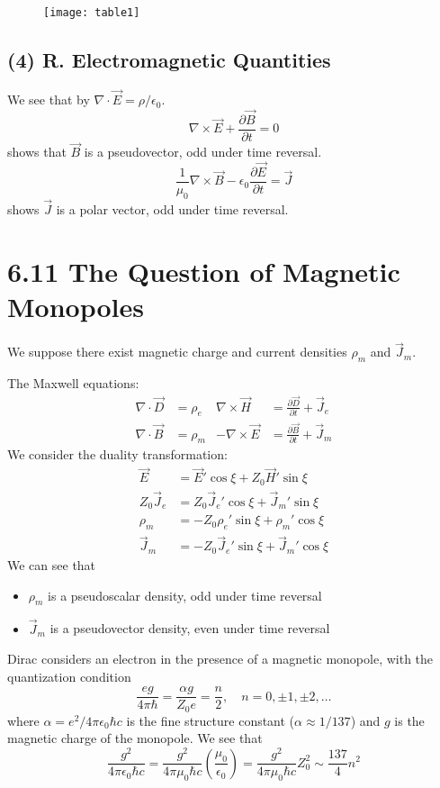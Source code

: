 \documentclass{article}
\begin{document}
	\begin{figure}[h]
		\centering
		\texttt{[image: table1]}
		\caption{}
		\label{table1}
	\end{figure}
	
	\subsection*{(4) R. Electromagnetic Quantities}
	We see that by $\nabla \cdot \vec{E} = \rho / \epsilon_0$.
	\[
	\nabla \times \vec{E} + \frac{\partial\vec{B}}{\partial t} = 0
	\]
	shows that $\vec{B}$ is a pseudovector, odd under time reversal.
	\[
	\frac{1}{\mu_0} \nabla \times \vec{B} - \epsilon_0 \frac{\partial\vec{E}}{\partial t} = \vec{J}
	\]
	shows $\vec{J}$ is a polar vector, odd under time reversal.
	\section*{6.11 The Question of Magnetic Monopoles}
	We suppose there exist magnetic charge and current densities $\rho_m$ and $\vec{J}_m$.
	
	The Maxwell equations:
	\begin{align}
		\nabla \cdot \vec{D} &= \rho_e & \nabla \times \vec{H} &= \frac{\partial \vec{D}}{\partial t} + \vec{J}_e \\
		\nabla \cdot \vec{B} &= \rho_m & -\nabla \times \vec{E} &= \frac{\partial \vec{B}}{\partial t} + \vec{J}_m
	\end{align}
	We consider the duality transformation:
	\begin{align}
		\vec{E} &= \vec{E}' \cos\xi + Z_0 \vec{H}' \sin\xi \\
		Z_0 \vec{J}_e &= Z_0 \vec{J}_e' \cos\xi + \vec{J}_m' \sin\xi \\
		\rho_m &= -Z_0 \rho_e' \sin\xi + \rho_m' \cos\xi \\
		\vec{J}_m &= -Z_0 \vec{J}_e' \sin\xi + \vec{J}_m' \cos\xi
	\end{align}
	We can see that
	\begin{itemize}
		\item $\rho_m$ is a pseudoscalar density, odd under time reversal
		\item $\vec{J}_m$ is a pseudovector density, even under time reversal
	\end{itemize}
	Dirac considers an electron in the presence of a magnetic monopole, with the quantization condition
	\begin{equation}
		\frac{eg}{4\pi\hbar} = \frac{\alpha g}{Z_0 e} = \frac{n}{2}, \quad n=0, \pm 1, \pm 2, \dots
	\end{equation}
	where $\alpha = e^2 / 4\pi\epsilon_0\hbar c$ is the fine structure constant ($\alpha \approx 1/137$) and $g$ is the magnetic charge of the monopole.
	We see that
	\begin{equation}
		\frac{g^2}{4\pi\epsilon_0\hbar c} = \frac{g^2}{4\pi\mu_0\hbar c} \left( \frac{\mu_0}{\epsilon_0} \right) = \frac{g^2}{4\pi\mu_0\hbar c} Z_0^2 \sim \frac{137}{4} n^2
	\end{equation}
	
\end{document}
